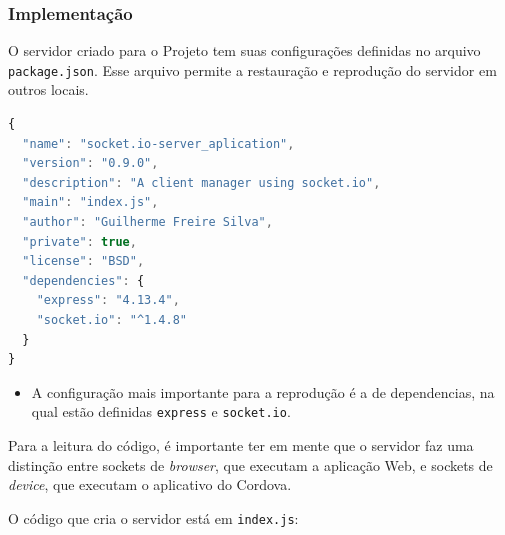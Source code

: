 \documentclass[a4paper,12pt]{article}
\newcommand{\code}[1]{\lstinline[mathescape=true, columns=fixed, basicstyle={\small\ttfamily}]{#1}}
\begin{document}

\subsubsection{Implementação}

O servidor criado para o Projeto tem suas configurações definidas no arquivo \code{package.json}. Esse arquivo permite a restauração e reprodução do servidor em outros locais.


\begin{lstlisting}[language=JavaScript]
{
  "name": "socket.io-server_aplication",
  "version": "0.9.0",
  "description": "A client manager using socket.io",
  "main": "index.js",
  "author": "Guilherme Freire Silva",
  "private": true,
  "license": "BSD",
  "dependencies": {
    "express": "4.13.4",
    "socket.io": "^1.4.8"
  }
}

\end{lstlisting}

\begin{itemize}
  \item A configuração mais importante para a reprodução é a de dependencias, na qual estão definidas \code{express} e \code{socket.io}.
\end{itemize}

Para a leitura do código, é importante ter em mente que o servidor faz uma distinção entre sockets de \emph{browser}, que executam a aplicação Web, e sockets de \emph{device}, que executam o aplicativo do Cordova.

O código que cria o servidor está em \code{index.js}:
\end{document}
